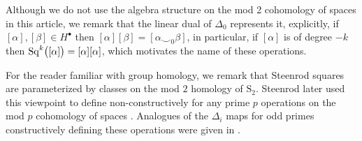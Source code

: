Although we do not use the algebra structure on the mod 2 cohomology of spaces in this article, we remark that the linear dual of $\Delta_0$ represents it, explicitly, if $[\alpha], [\beta] \in H^\bullet$ then $[\alpha][\beta] = [\alpha \smallsmile_0 \beta]$, in particular, if $[\alpha]$ is of degree $-k$ then $\mathrm{Sq}^k\big([\alpha]\big) = [\alpha] [\alpha]$, which motivates the name of these operations.

For the reader familiar with group homology, we remark that Steenrod squares are parameterized by classes on the mod $2$ homology of $\mathrm S_2$.
Steenrod later used this viewpoint to define non-constructively for any prime $p$ operations on the mod $p$ cohomology of spaces \cite{steenrod1962cohomology}.
Analogues of the $\Delta_i$ maps for odd primes constructively defining these operations were given in \cite{medina2020odd}.